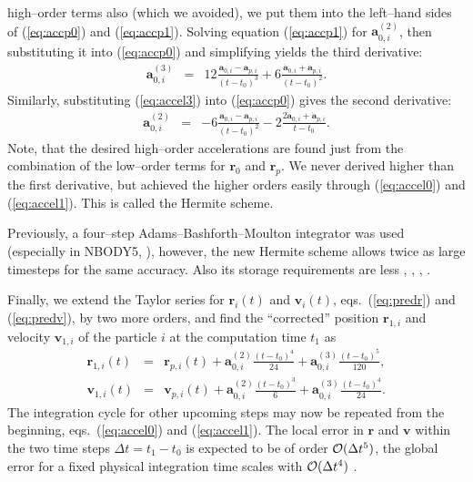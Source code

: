 high--order terms also (which we avoided),
we put them into the left--hand sides of (\ref{eq:accp0})
and (\ref{eq:accp1}).
Solving equation (\ref{eq:accp1}) for $\mathbf a_{0,i}^{(2)}$,
then substituting it into (\ref{eq:accp0}) and simplifying yields
the third derivative:
%
\begin{eqnarray}
\mathbf a_{0,i}^{(3)}
        &=& 12\frac{\mathbf a_{0,i} - \mathbf a_{p,i}}%
                   {(t - t_0)^3}
           + 6\frac{\dot{\mathbf a}_{0,i} + \dot{\mathbf a}_{p,i}}%
                   {(t - t_0)^2} . \label{eq:accel3}
\end{eqnarray}
%
Similarly, substituting (\ref{eq:accel3}) into
(\ref{eq:accp0}) gives the second derivative:
%
\begin{eqnarray}
\mathbf a_{0,i}^{(2)}
        &=&  -6\frac{\mathbf a_{0,i} - \mathbf a_{p,i}}%
                    {(t - t_0)^2}
             -2\frac{2\dot{\mathbf a}_{0,i} + \dot{\mathbf a}_{p,i}}%
                    {t - t_0}.  \label{eq:accel2}
\end{eqnarray}
%
Note, that the desired high--order accelerations are found
just from the combination of the low--order terms for
$\mathbf r_0$ and $\mathbf r_p$.
We never derived higher than the first derivative, but
achieved the higher orders easily through (\ref{eq:accel0})
and (\ref{eq:accel1}).
This is called the Hermite scheme.


Previously, a four--step Adams--Bashforth--Moulton integrator
was used (especially in NBODY5, \cite{a_85}),
however, the new Hermite scheme allows twice as large timesteps
for the same accuracy.
Also its storage requirements are less
\cite{m_91b}, \cite{ma_92}, \cite{a_99a}, \cite{a_99b}.

Finally, we extend the Taylor series for $\mathbf r_i(t)$
and $\mathbf v_i(t)$, eqs.~(\ref{eq:predr}) and
(\ref{eq:predv}), by two more orders,
and find the ``corrected'' position $\mathbf r_{1,i}$
and velocity $\mathbf v_{1,i}$ of the particle $i$
at the computation time $t_1$ as
%
\begin{eqnarray}
\mathbf r_{1,i}(t)
        &=&  \mathbf r_{p,i}(t)
           + \mathbf a_{0,i}^{(2)}\frac{(t - t_0)^4}{24}
           + \mathbf a_{0,i}^{(3)}\frac{(t - t_0)^5}{120} , \\
%
\mathbf v_{1,i}(t)
        &=&  \mathbf v_{p,i}(t)
           + \mathbf a_{0,i}^{(2)}\frac{(t - t_0)^3}{6}
           + \mathbf a_{0,i}^{(3)}\frac{(t - t_0)^4}{24} .
\end{eqnarray}
%
The integration cycle for other upcoming steps may now be
repeated from the beginning, eqs.\ (\ref{eq:accel0}) and
(\ref{eq:accel1}).
The local error in $\mathbf r$ and $\mathbf v$ within the two time
steps $\Delta t = t_1 - t_0$ is expected to be of order
${\cal O}(\Delta t^5)$, the global error for a fixed physical
integration time scales with ${\cal O}(\Delta t^4)$ \cite{m_91a}.

